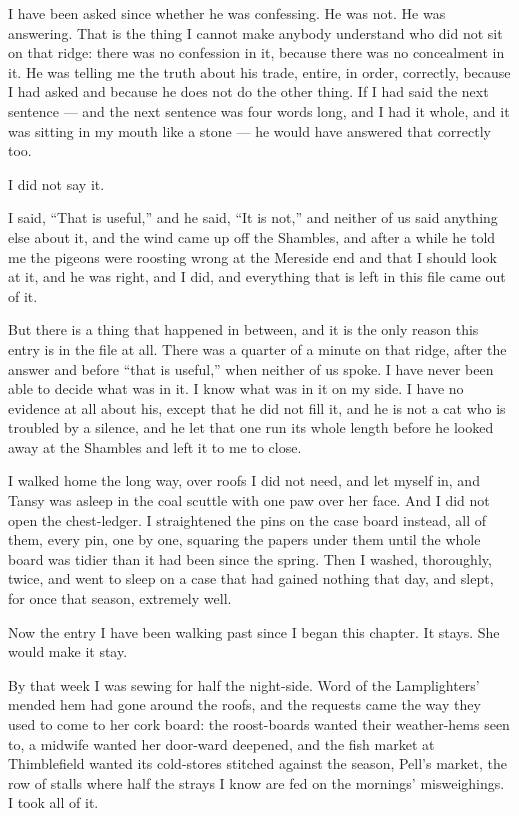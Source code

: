 I have been asked since whether he was confessing. He was not. He was answering. That is the thing I cannot make anybody understand who did not sit on that ridge: there was no confession in it, because there was no concealment in it. He was telling me the truth about his trade, entire, in order, correctly, because I had asked and because he does not do the other thing. If I had said the next sentence --- and the next sentence was four words long, and I had it whole, and it was sitting in my mouth like a stone --- he would have answered that correctly too.

I did not say it.

I said, ``That is useful,'' and he said, ``It is not,'' and neither of us said anything else about it, and the wind came up off the Shambles, and after a while he told me the pigeons were roosting wrong at the Mereside end and that I should look at it, and he was right, and I did, and everything that is left in this file came out of it.

But there is a thing that happened in between, and it is the only reason this entry is in the file at all. There was a quarter of a minute on that ridge, after the answer and before ``that is useful,'' when neither of us spoke. I have never been able to decide what was in it. I know what was in it on my side. I have no evidence at all about his, except that he did not fill it, and he is not a cat who is troubled by a silence, and he let that one run its whole length before he looked away at the Shambles and left it to me to close.

I walked home the long way, over roofs I did not need, and let myself in, and Tansy was asleep in the coal scuttle with one paw over her face. And I did not open the chest-ledger. I straightened the pins on the case board instead, all of them, every pin, one by one, squaring the papers under them until the whole board was tidier than it had been since the spring. Then I washed, thoroughly, twice, and went to sleep on a case that had gained nothing that day, and slept, for once that season, extremely well.

\scenebreak

Now the entry I have been walking past since I began this chapter. It stays. She would make it stay.

By that week I was sewing for half the night-side. Word of the Lamplighters' mended hem had gone around the roofs, and the requests came the way they used to come to her cork board: the roost-boards wanted their weather-hems seen to, a midwife wanted her door-ward deepened, and the fish market at Thimblefield wanted its cold-stores stitched against the season, Pell's market, the row of stalls where half the strays I know are fed on the mornings' misweighings. I took all of it.

